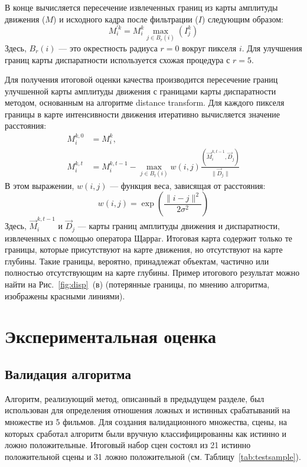 \documentclass[14pt, a4paper]{extarticle}
\begin{document}
В конце вычисляется пересечение извлеченных границ из карты амплитуды движения ($M$) 
и исходного кадра после фильтрации  ($I$) следующим образом:
\begin{equation}
M_i^{'k} =M_i^k\max_{j  \in B_{r}(i)}(I_j^k)
\end{equation}
Здесь, $B_{r}(i)$ --- это окрестность радиуса $r = 0$ вокруг пикселя $i$. Для улучшения границ 
карты диспаратности используется схожая процедура с $r = 5$.

Для получения итоговой оценки качества производится пересечение границ улучшенной карты
амплитуды движения с границами карты диспаратности методом, основанным на алгоритме
distance transform. Для каждого пикселя границы в карте интенсивности движения итеративно
вычисляется значение расстояния:
\begin{equation}
\begin{split}
M_i^{k,0} &= M_i^k, \\
M_i^{k,t} &= M_i^{k,t-1} - \max_{j \in B_t(i)}w(i,j)\frac{\left(\vec{M}_i^{k,t-1}, \vec{D}_j  \right)}{\lVert\vec{D}_j\rVert}
\end{split}
\end{equation}
В этом выражении, $w(i,j)$  --- функция веса, зависящая от расстояния:
\begin{equation}
w(i,j) = \exp\left(\frac{\lVert i-j \rVert^2}{2\sigma^2}\right)
\end{equation}
Здесь, $\vec{M}_i^{k,t-1}$ и $\vec{D}_j$ --- карты границ амплитуды движения и диспаратности, 
извлеченных с помощью оператора Щарраr. Итоговая карта содержит только те границы,
которые присутствуют на карте движения, но отсутствуют на карте глубины. Такие границы,
вероятно, принадлежат объектам, частично или полностью отсутствующим на карте глубины.
Пример итогового результат можно найти на Рис.~\ref{fig:disp}~(в) (потерянные границы, 
по мнению алгоритма, изображены красными линиями).

\newpage
\section{Экспериментальная оценка}

\subsection{Валидация алгоритма}



Алгоритм, реализующий метод, описанный в предыдущем разделе, был использован 
для определения отношения ложных и истинных срабатываний на множестве из 5 фильмов.
Для создания валидационного множества, сцены, на которых сработал алгоритм были вручную
классифицированны как истинно и ложно положительные. Итоговый набор сцен состоял 
из 21 истинно положительной сцены и 31 ложно положительной (см. Таблицу~\ref{tab:testsample}).
\end{document}
